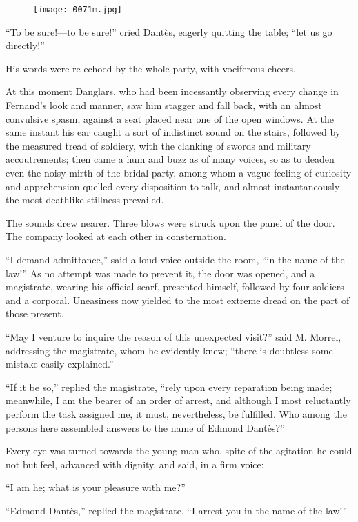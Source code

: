 \begin{figure}[h]
\texttt{[image: 0071m.jpg]}
\end{figure}

“To be sure!—to be sure!” cried Dantès, eagerly quitting the table;
“let us go directly!”

His words were re-echoed by the whole party, with vociferous cheers.

At this moment Danglars, who had been incessantly observing every
change in Fernand’s look and manner, saw him stagger and fall back,
with an almost convulsive spasm, against a seat placed near one of the
open windows. At the same instant his ear caught a sort of indistinct
sound on the stairs, followed by the measured tread of soldiery, with
the clanking of swords and military accoutrements; then came a hum and
buzz as of many voices, so as to deaden even the noisy mirth of the
bridal party, among whom a vague feeling of curiosity and apprehension
quelled every disposition to talk, and almost instantaneously the most
deathlike stillness prevailed.

The sounds drew nearer. Three blows were struck upon the panel of the
door. The company looked at each other in consternation.

“I demand admittance,” said a loud voice outside the room, “in the name
of the law!” As no attempt was made to prevent it, the door was opened,
and a magistrate, wearing his official scarf, presented himself,
followed by four soldiers and a corporal. Uneasiness now yielded to the
most extreme dread on the part of those present.

“May I venture to inquire the reason of this unexpected visit?” said M.
Morrel, addressing the magistrate, whom he evidently knew; “there is
doubtless some mistake easily explained.”

“If it be so,” replied the magistrate, “rely upon every reparation
being made; meanwhile, I am the bearer of an order of arrest, and
although I most reluctantly perform the task assigned me, it must,
nevertheless, be fulfilled. Who among the persons here assembled
answers to the name of Edmond Dantès?”

Every eye was turned towards the young man who, spite of the agitation
he could not but feel, advanced with dignity, and said, in a firm
voice:

“I am he; what is your pleasure with me?”

“Edmond Dantès,” replied the magistrate, “I arrest you in the name of
the law!”

